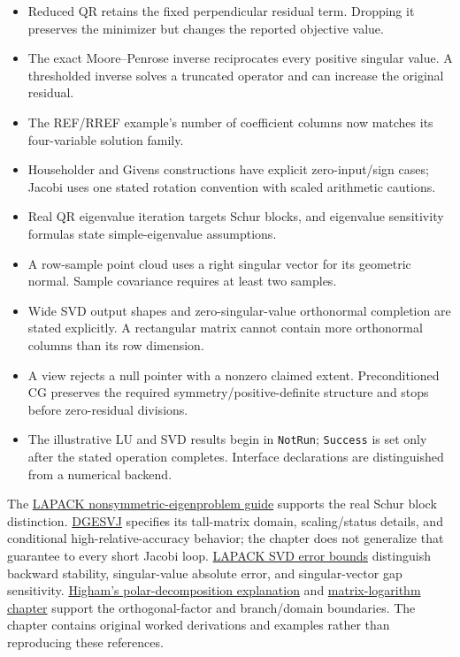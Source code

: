 \begin{itemize}
\tightlist
\item
  Reduced QR retains the fixed perpendicular residual term. Dropping it preserves the minimizer but changes the reported objective value.
\item
  The exact Moore--Penrose inverse reciprocates every positive singular value. A thresholded inverse solves a truncated operator and can increase the original residual.
\item
  The REF/RREF example's number of coefficient columns now matches its four-variable solution family.
\item
  Householder and Givens constructions have explicit zero-input/sign cases; Jacobi uses one stated rotation convention with scaled arithmetic cautions.
\item
  Real QR eigenvalue iteration targets Schur blocks, and eigenvalue sensitivity formulas state simple-eigenvalue assumptions.
\item
  A row-sample point cloud uses a right singular vector for its geometric normal. Sample covariance requires at least two samples.
\item
  Wide SVD output shapes and zero-singular-value orthonormal completion are stated explicitly. A rectangular matrix cannot contain more orthonormal columns than its row dimension.
\item
  A view rejects a null pointer with a nonzero claimed extent. Preconditioned CG preserves the required symmetry/positive-definite structure and stops before zero-residual divisions.
\item
  The illustrative LU and SVD results begin in \texttt{NotRun}; \texttt{Success} is set only after the stated operation completes. Interface declarations are distinguished from a numerical backend.
\end{itemize}

The \href{https://netlib.org/lapack/lug/node31.html}{LAPACK nonsymmetric-eigenproblem guide} supports the real Schur block distinction. \href{https://www.netlib.org/lapack/explore-html/d9/deb/group__gesvj_ga7aec05d2a1523bbeee77ece21b12187c.html}{DGESVJ} specifies its tall-matrix domain, scaling/status details, and conditional high-relative-accuracy behavior; the chapter does not generalize that guarantee to every short Jacobi loop. \href{https://www.netlib.org/lapack/lug/node97.html}{LAPACK SVD error bounds} distinguish backward stability, singular-value absolute error, and singular-vector gap sensitivity. \href{https://nhigham.com/2020/07/28/what-is-the-polar-decomposition/comment-page-1/}{Higham's polar-decomposition explanation} and \href{https://epubs.siam.org/doi/10.1137/1.9780898717778.ch11}{matrix-logarithm chapter} support the orthogonal-factor and branch/domain boundaries. The chapter contains original worked derivations and examples rather than reproducing these references.

